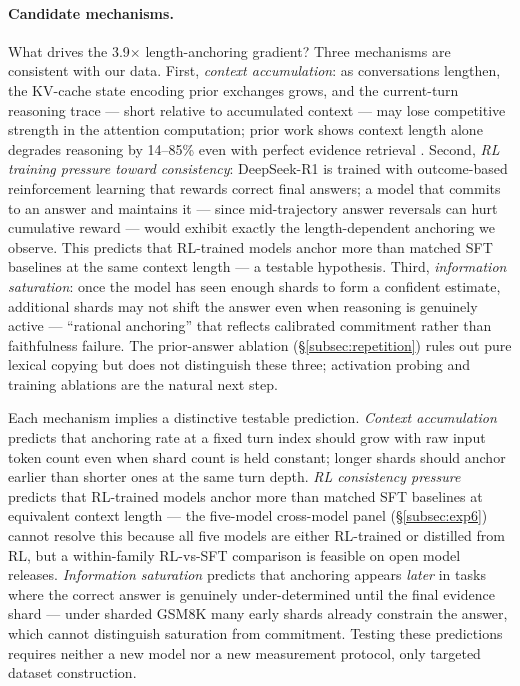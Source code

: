 \documentclass{article}
\begin{document}
\paragraph{Candidate mechanisms.}
What drives the 3.9$\times$ length-anchoring gradient?
Three mechanisms are consistent with our data.
First, \emph{context accumulation}: as conversations lengthen, the
KV-cache state encoding prior exchanges grows, and the current-turn
reasoning trace --- short relative to accumulated context --- may
lose competitive strength in the attention computation; prior work
shows context length alone degrades reasoning by 14--85\% even
with perfect evidence retrieval \citep{context_length_hurts2025}.
Second, \emph{RL training pressure toward consistency}: DeepSeek-R1
is trained with outcome-based reinforcement learning
\citep{deepseekr1_2025} that rewards correct final answers;
a model that commits to an answer and maintains it --- since
mid-trajectory answer reversals can hurt cumulative reward
--- would exhibit exactly the length-dependent anchoring we observe.
This predicts that RL-trained models anchor more than matched
SFT baselines at the same context length --- a testable hypothesis.
Third, \emph{information saturation}: once the model has seen
enough shards to form a confident estimate, additional shards may
not shift the answer even when reasoning is genuinely active ---
``rational anchoring'' that reflects calibrated commitment rather
than faithfulness failure.
The prior-answer ablation (\S\ref{subsec:repetition}) rules out
pure lexical copying but does not distinguish these three;
activation probing and training ablations are the natural next step.

Each mechanism implies a distinctive testable prediction.
\emph{Context accumulation} predicts that anchoring rate at a fixed
turn index should grow with raw input token count even when shard
count is held constant; longer shards should anchor earlier than
shorter ones at the same turn depth.
\emph{RL consistency pressure} predicts that RL-trained models
anchor more than matched SFT baselines at equivalent context
length --- the five-model cross-model panel (\S\ref{subsec:exp6})
cannot resolve this because all five models are either RL-trained
or distilled from RL, but a within-family RL-vs-SFT comparison
is feasible on open model releases.
\emph{Information saturation} predicts that anchoring appears
\emph{later} in tasks where the correct answer is genuinely
under-determined until the final evidence shard --- under sharded
GSM8K many early shards already constrain the answer, which cannot
distinguish saturation from commitment.
Testing these predictions requires neither a new model nor a new
measurement protocol, only targeted dataset construction.
\end{document}
